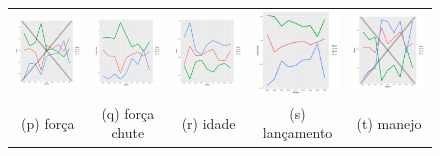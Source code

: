 \documentclass[review]{elsarticle}
\begin{document}
\begin{figure}[!bp]
\begin{tabular}{ccccc}
  \includegraphics[width=25mm]{forca_result} & \includegraphics[width=25mm]{forcachute_result}  &   \includegraphics[width=25mm]{idade_result} &
  \includegraphics[width=25mm]{lancamento_result}  & \includegraphics[width=25mm]{manejo_result}  \\
 \scriptsize{(p) força} & \scriptsize{(q) força chute } & \scriptsize{(r) idade} & \scriptsize{(s) lançamento} & \scriptsize{(t) manejo}\\[3pt]
 

\end{tabular}
\end{figure}
\end{document}
